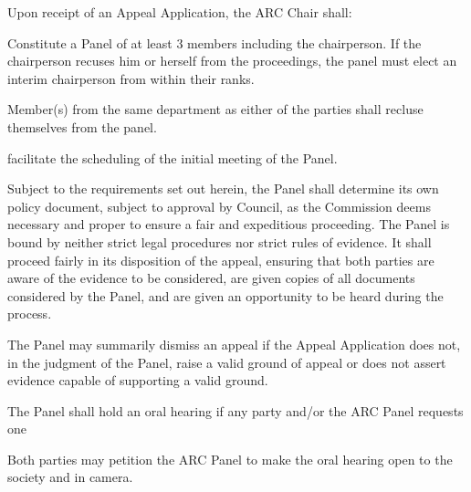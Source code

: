 \begin{longenum}[ label*=\arabic*., align=left]
\begin{longenum}[ label*=\arabic*., align=left]
\item Upon receipt of  an Appeal Application, the ARC Chair shall:
 \begin{longenum}[ label*=\arabic*., align=left]
			\item Constitute a Panel of at least 3 members including the chairperson. If the chairperson recuses him or herself from the proceedings, the panel must elect an interim chairperson from within their ranks.
            
            \begin{longenum}[ label*=\arabic*., align=left]
			\item  Member(s) from the same department as either of the parties shall recluse themselves from the panel.
      \end{longenum}
     \item facilitate the scheduling of the initial meeting of the Panel.       
     \end{longenum}
 	\item Subject  to  the  requirements  set  out  herein,  the  Panel  shall  determine  its  own policy document,  subject  to  approval  by  Council,  as  the  Commission  deems  necessary  and  proper  to ensure a fair and expeditious proceeding. The Panel is bound by neither strict legal procedures nor  strict  rules  of  evidence.  It shall  proceed  fairly  in  its  disposition  of  the  appeal,  ensuring  that both  parties  are  aware  of  the evidence  to  be  considered,  are  given  copies  of  all  documents considered by the Panel, and are given an opportunity to be heard during the process.   
    \item The  Panel  may  summarily  dismiss  an  appeal  if  the  Appeal  Application  does  not,  in  the judgment  of  the  Panel,  raise  a  valid  ground  of  appeal  or  does  not  assert  evidence  capable  of supporting a valid ground.
	\item The Panel shall hold an oral hearing if any party and/or the ARC Panel requests one
    \item Both parties may petition the ARC Panel to make the oral hearing open to the society and in camera.


\end{longenum}
\end{longenum}
